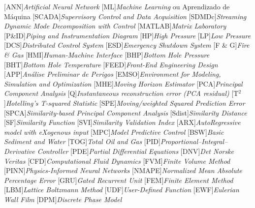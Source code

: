 \begin{acronym}
    [ANN]{\textit{Artificial Neural Network}}
    [ML]{\textit{Machine Learning} ou Aprendizado de Máquina}
    [SCADA]{\textit{Supervisory Control and Data Acquisition}}
    [SDMDc]{\textit{Streaming Dynamic Mode Decomposition with Control}}
    [MATLAB]{\textit{Matrix Laboratory}}
    [P\&ID]{\textit{Piping and Instrumentation Diagram}}
    [HP]{\textit{High Pressure}}
    [LP]{\textit{Low Pressure}}
    [DCS]{\textit{Distributed Control System}}
    [ESD]{\textit{Emergency Shutdown System}}
    [F \& G]{\textit{Fire \& Gas}}
    [HMI]{\textit{Human-Machine Interface}}
    [BHP]{\textit{Bottom Hole Pressure}}
    [BHT]{\textit{Bottom Hole Temperature}}
    [FEED]{\textit{Front-End Engineering Design}}
    [APP]{\textit{Análise Preliminar de Perigos}}
    [EMSO]{\textit{Environment for Modeling, Simulation and Optimization}}
    [MHE]{\textit{Moving Horizon Estimator}}
    [PCA]{\textit{Principal Component Analysis}}
    [Q]{\textit{Instantaneous reconstruction error (PCA residual)}}
    [T$^2$]{\textit{Hotelling's T-squared Statistic}}
    [SPE]{\textit{Moving/weighted Squared Prediction Error}}
    [SPCA]{\textit{Similarity-based Principal Component Analysis}}
    [Sdist]{\textit{Similarity Distance}}
    [SF]{\textit{Similarity Function}}
    [SVI]{\textit{Similarity Validation Index}}
    [ARX]{\textit{AutoRegressive model with eXogenous input}}
    [MPC]{\textit{Model Predictive Control}}
    [BSW]{\textit{Basic Sediment and Water}}
    [TOG]{\textit{Total Oil and Gas}}
    [PID]{\textit{Proportional–Integral–Derivative Controller}}
    [PDE]{\textit{Partial Differential Equations}}
    [DNV]{\textit{Det Norske Veritas}}
    [CFD]{\textit{Computational Fluid Dynamics}}
    [FVM]{\textit{Finite Volume Method}}
    [PINN]{\textit{Physics-Informed Neural Networks}}
    [NMAPE]{\textit{Normalized Mean Absolute Percentage Error}}
    [GRU]{\textit{Gated Recurrent Unit}}
    [FEM]{\textit{Finite Element Method}}
    [LBM]{\textit{Lattice Boltzmann Method}}
    [UDF]{\textit{User-Defined Function}}
    [EWF]{\textit{Eulerian Wall Film}}
    [DPM]{\textit{Discrete Phase Model}}

\end{acronym}
